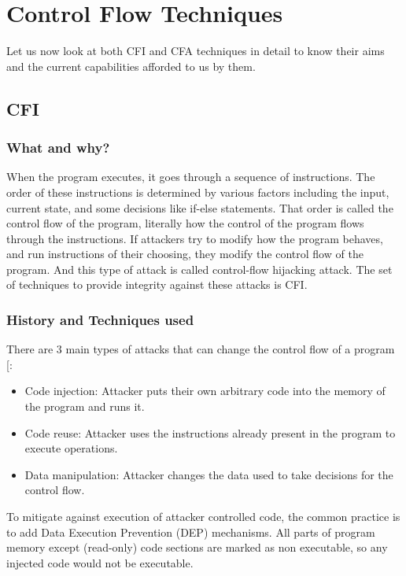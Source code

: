 \documentclass[a4paper, nobind]{templates/ociamthesis}
\providecommand{\tightlist}{%
  \setlength{\itemsep}{0pt}\setlength{\parskip}{0pt}}
\begin{document}
\section{Control Flow Techniques}\label{control-flow-techniques}

Let us now look at both CFI and CFA techniques in detail to know their aims and the current
capabilities afforded to us by them.

\subsection{CFI}\label{cfi}

\subsubsection{What and why?}\label{what-and-why}

When the program executes, it goes through a sequence of instructions. The order
of these instructions is determined by various factors including the input, current state,
and some decisions like if-else statements. That order is called the control flow
of the program, literally how the control of the program flows through the instructions.
If attackers try to modify how the program behaves, and run instructions
of their choosing, they modify the control flow of the program. And this type of attack is
called control-flow hijacking attack.
The set of techniques to provide integrity against these attacks is CFI.

\subsubsection{History and Techniques used}\label{history-and-techniques-used}

There are 3 main types of attacks that can change the control flow of a program {[}\citeproc{ref-sok}{2}{]}:

\begin{itemize}
\tightlist
\item
  Code injection: Attacker puts their own arbitrary code into the memory of the program and runs it.
\item
  Code reuse: Attacker uses the instructions already present in the program to execute operations.
\item
  Data manipulation: Attacker changes the data used to take decisions for the control flow.
\end{itemize}

To mitigate against execution of attacker controlled code, the common practice is
to add Data Execution Prevention (DEP) mechanisms. All parts of program memory except
(read-only) code sections are marked as non executable, so any injected code would not be executable.
\end{document}
